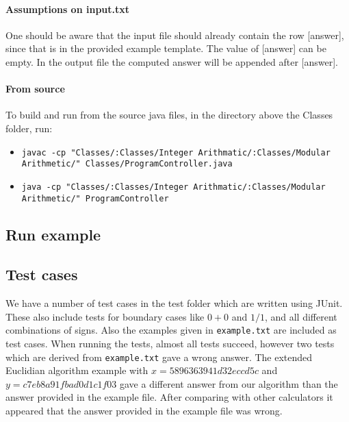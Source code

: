 \documentclass[a4paper]{article}
\begin{document}
\paragraph{Assumptions on input.txt}

One should be aware that the input file should already contain the row [answer], since that is in the provided example template.
The value of [answer] can be empty.
In the output file the computed answer will be appended after [answer].



\paragraph{From source}

To build and run from the source java files, in the directory above the Classes folder, run:

\begin{itemize}
\item \texttt{javac -cp "Classes/:Classes/Integer Arithmatic/:Classes/Modular Arithmetic/" Classes/ProgramController.java}
\item \texttt{java -cp "Classes/:Classes/Integer Arithmatic/:Classes/Modular Arithmetic/" ProgramController}
\end{itemize}



\subsection{Run example}


\subsection{Test cases}

We have a number of test cases in the test folder which are written using JUnit.
These also include tests for boundary cases like $0+0$ and $1/1$, and all different combinations of signs.
Also the examples given in \texttt{example.txt} are included as test cases.
When running the tests, almost all tests succeed, however two tests which are derived from \texttt{example.txt} gave a wrong answer.
The extended Euclidian algorithm example with $x=5896363941d32eccd5c$ and $y=c7eb8a91fbad0d1c1f03$ gave a different answer from our algorithm than
the answer provided in the example file.
After comparing with other calculators it appeared that the answer provided in the example file was wrong.
\end{document}

